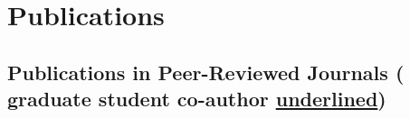 \documentclass[12pt,letterpaper]{report}
\newcommand{\listitemspace}{0.15em} %
\renewenvironment{itemize}
{\begin{list}{}{\setlength{\leftmargin}{0em}
            \setlength{\parskip}{0em}
            \setlength{\itemsep}{\listitemspace}
            \setlength{\parsep}{\listitemspace}}}
{\end{list}}
\begin{document}







    \section*{Publications}
    \subsection*{Publications in Peer-Reviewed Journals {\scriptsize( graduate student co-author \underline{underlined})}}
\end{document}
